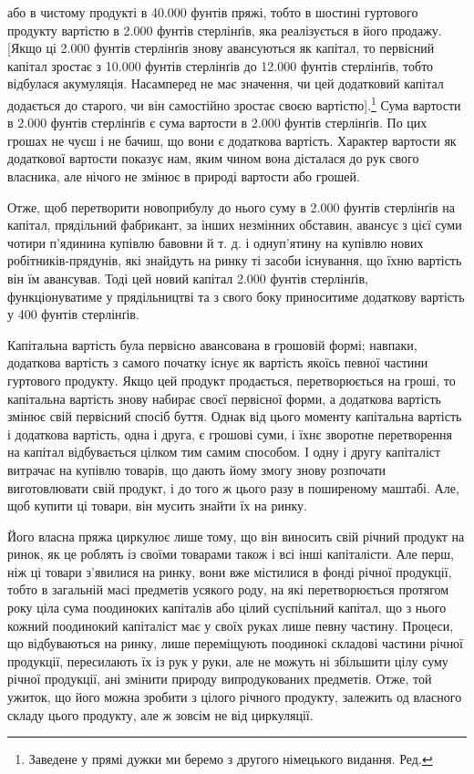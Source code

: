\parcont{}  %
або в чистому продукті в 40.000 фунтів пряжі, тобто в шостині
гуртового продукту вартістю в 2.000 фунтів стерлінґів, яка
реалізується в його продажу. [Якщо ці 2.000 фунтів стерлінґів
знову авансуються як капітал, то первісний капітал зростає
з 10.000 фунтів стерлінґів до 12.000 фунтів стерлінґів, тобто
відбулася акумуляція. Насамперед не має значення, чи цей додатковий
капітал додається до старого, чи він самостійно зростає
своєю вартістю].\footnote*{
Заведене у прямі дужки ми беремо з другого німецького видання.
Ред.
} Сума вартости в 2.000 фунтів стерлінґів є сума
вартости в 2.000 фунтів стерлінґів. По цих грошах не чуєш і не
бачиш, що вони є додаткова вартість. Характер вартости як додаткової
вартости показує нам, яким чином вона дісталася до
рук свого власника, але нічого не змінює в природі вартости
або грошей.

Отже, щоб перетворити новоприбулу до нього суму в 2.000 фунтів
стерлінґів на капітал, прядільний фабрикант, за інших незмінних
обставин, авансує з цієї суми чотири п’ядинина купівлю
бавовни й т. д. і однуп’ятину на купівлю нових робітників-прядунів,
які знайдуть на ринку ті засоби існування, що їхню вартість
він їм авансував. Тоді цей новий капітал 2.000 фунтів
стерлінґів, функціонуватиме у прядільництві та з свого боку
приноситиме додаткову вартість у 400 фунтів стерлінґів.

Капітальна вартість була первісно авансована в грошовій
формі; навпаки, додаткова вартість з самого початку існує як
вартість якоїсь певної частини гуртового продукту. Якщо цей
продукт продається, перетворюється на гроші, то капітальна
вартість знову набирає своєї первісної форми, а додаткова вартість
змінює свій первісний спосіб буття. Однак від цього моменту
капітальна вартість і додаткова вартість, одна і друга, є грошові
суми, і їхнє зворотне перетворення на капітал відбувається цілком
тим самим способом. І одну і другу капіталіст витрачає на
купівлю товарів, що дають йому змогу знову розпочати виготовлювати
свій продукт, і до того ж цього разу в поширеному
маштабі. Але, щоб купити ці товари, він мусить знайти їх на ринку.

Його власна пряжа циркулює лише тому, що він виносить
свій річний продукт на ринок, як це роблять із своїми товарами
також і всі інші капіталісти. Але перш, ніж ці товари з’явилися
на ринку, вони вже містилися в фонді річної продукції, тобто в
загальній масі предметів усякого роду, на які перетворюється
протягом року ціла сума поодиноких капіталів або цілий суспільний
капітал, що з нього кожний поодинокий капіталіст має
у своїх руках лише певну частину. Процеси, що відбуваються на
ринку, лише переміщують поодинокі складові частини річної
продукції, пересилають їх із рук у руки, але не можуть ні збільшити
цілу суму річної продукції, ані змінити природу випродукованих
предметів. Отже, той ужиток, що його можна зробити
з цілого річного продукту, залежить од власного складу цього
продукту, але ж зовсім не від циркуляції.
